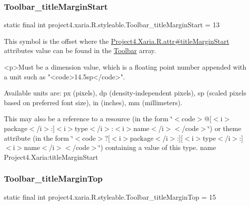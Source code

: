 \subsubsection{\texorpdfstring{Toolbar\+\_\+title\+Margin\+Start}{Toolbar\_titleMarginStart}}
{\footnotesize\ttfamily static final int project4.\+xaria.\+R.\+styleable.\+Toolbar\+\_\+title\+Margin\+Start = 13\hspace{0.3cm}{\ttfamily [static]}}

This symbol is the offset where the \hyperlink{}{Project4.\+Xaria.\+R.\+attr\#title\+Margin\+Start} attribute\textquotesingle{}s value can be found in the \hyperlink{classproject4_1_1xaria_1_1R_1_1styleable_af6c30f9e9e086f6bf4e510669443fa59}{Toolbar} array.

\begin{DoxyVerb}      <p>Must be a dimension value, which is a floating point number appended with a unit such as "<code>14.5sp</code>".
\end{DoxyVerb}
 Available units are\+: px (pixels), dp (density-\/independent pixels), sp (scaled pixels based on preferred font size), in (inches), mm (millimeters). 

This may also be a reference to a resource (in the form \char`\"{}$<$code$>$@\mbox{[}$<$i$>$package$<$/i$>$\+:\mbox{]}$<$i$>$type$<$/i$>$\+:$<$i$>$name$<$/i$>$$<$/code$>$\char`\"{}) or theme attribute (in the form \char`\"{}$<$code$>$?\mbox{[}$<$i$>$package$<$/i$>$\+:\mbox{]}\mbox{[}$<$i$>$type$<$/i$>$\+:\mbox{]}$<$i$>$name$<$/i$>$$<$/code$>$\char`\"{}) containing a value of this type.  name Project4.\+Xaria\+:title\+Margin\+Start \mbox{\label{classproject4_1_1xaria_1_1R_1_1styleable_aae9e96acb00fe36e1bac77812532a605}} 
\subsubsection{\texorpdfstring{Toolbar\+\_\+title\+Margin\+Top}{Toolbar\_titleMarginTop}}
{\footnotesize\ttfamily static final int project4.\+xaria.\+R.\+styleable.\+Toolbar\+\_\+title\+Margin\+Top = 15\hspace{0.3cm}{\ttfamily [static]}}

